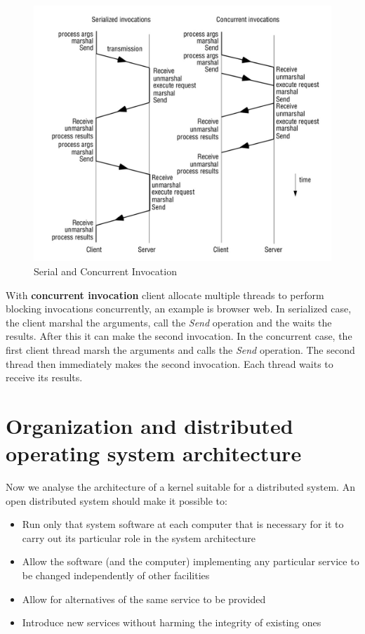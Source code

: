 \begin{figure}[!h]
    \centering
    \includegraphics[width=.7\linewidth]{images/OperatingSystemSupport/serialAndCOncurrentInvocation.jpeg}
    \caption{Serial and Concurrent Invocation}
\end{figure}
\newpage
With \textbf{concurrent invocation} client allocate multiple threads to perform blocking invocations concurrently, an example is browser web.
In serialized case, the client marshal the arguments, call the \textit{Send} operation and the waits the results. After this it can make the second invocation. In the concurrent case, the first client thread marsh the arguments and calls the \textit{Send} operation. The second thread then immediately makes the second invocation. Each thread waits to receive its results.

\section{Organization and distributed operating system architecture}
Now we analyse the architecture of a kernel suitable for a distributed system. An open distributed system should make it possible to:
\begin{itemize}
    \item Run only that system software at each computer that is necessary for it to carry out its particular role in the system architecture
    \item Allow the software (and the computer) implementing any particular service to be changed independently of other facilities
    \item Allow for alternatives of the same service to be provided
    \item Introduce new services without harming the integrity of existing ones
\end{itemize}

